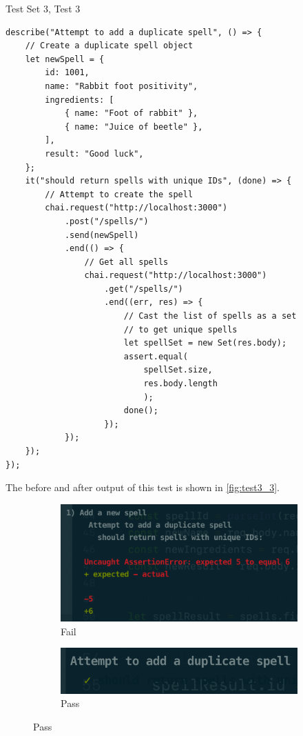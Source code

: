 \begin{listing}[h]
\caption{Test Set 3, Test 3}
\label{lis:test3_3}
\begin{verbatim}
describe("Attempt to add a duplicate spell", () => {
	// Create a duplicate spell object
	let newSpell = {
		id: 1001,
		name: "Rabbit foot positivity",
		ingredients: [
			{ name: "Foot of rabbit" },
			{ name: "Juice of beetle" },
		],
		result: "Good luck",
	};
	it("should return spells with unique IDs", (done) => {
		// Attempt to create the spell
		chai.request("http://localhost:3000")
			.post("/spells/")
			.send(newSpell)
			.end(() => {
				// Get all spells
				chai.request("http://localhost:3000")
					.get("/spells/")
					.end((err, res) => {
						// Cast the list of spells as a set
						// to get unique spells
						let spellSet = new Set(res.body);
						assert.equal(
							spellSet.size,
							res.body.length
							);
						done();
					});
			});
	});
});

\end{verbatim}
\end{listing}
The before and after output of this test is shown in \autoref{fig:test3_3}.
\begin{figure}[h]
\caption{Test output for test set 3, test 3}
\label{fig:test3_3}
	\centering
	\begin{subfigure}[b]{0.5\textwidth}
		\centering
		\includegraphics[width=\textwidth]{images/33_fail}
		\caption{Fail}
		\label{fig:test33_fail}
	\end{subfigure}
	\hfill
	\begin{subfigure}[b]{0.5\textwidth}
		\centering
		\includegraphics[width=\textwidth]{images/33_pass}
		\caption{Pass}
		\label{fig:test33_pass}
	\end{subfigure}
\end{figure}




